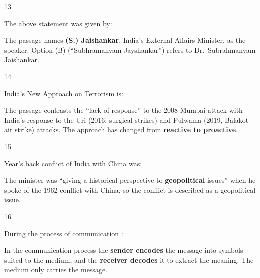 \begin{question}{13}
{The above statement was given by:\par}
\begin{explain}
The passage names \textbf{(S.) Jaishankar}, India's External Affairs Minister, as the speaker. Option (B) (``Subhramanyam Jayshankar'') refers to Dr.~Subrahmanyam Jaishankar.
\end{explain}
\end{question}

\begin{question}{14}
{India's New Approach on Terrorism is:\par}
\begin{explain}
The passage contrasts the ``lack of response'' to the 2008 Mumbai attack with India's response to the Uri (2016, surgical strikes) and Pulwama (2019, Balakot air strike) attacks. The approach has changed from \textbf{reactive to proactive}.
\end{explain}
\end{question}

\begin{question}{15}
{Year's back conflict of India with China was:\par}
\begin{explain}
The minister was ``giving a historical perspective to \textbf{geopolitical} issues'' when he spoke of the 1962 conflict with China, so the conflict is described as a geopolitical issue.
\end{explain}
\end{question}

\begin{question}{16}
{During the process of communication :\par}
\begin{explain}
In the communication process the \textbf{sender encodes} the message into symbols suited to the medium, and the \textbf{receiver decodes} it to extract the meaning. The medium only carries the message.
\end{explain}
\end{question}

